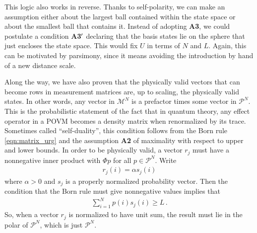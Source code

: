 \documentclass[%
 reprint,superscriptaddress,
 amsmath,amssymb,
 aps,pra, onecolumn, 12pt
]{revtex4-2}
\newcommand{\eqn}[1]{\begin{eqnarray} #1 \end{eqnarray}}
\newcommand{\zum}[2]{\displaystyle\sum_{#1}^{#2}}
\begin{document}
\begin{appendix}
This logic also works in reverse. Thanks to self-polarity, we can make an assumption either about the largest ball contained within the state space or about the smallest ball that contains it. Instead of adopting {\bf A3}, we could postulate a condition {\bf A3}${\bf '}$ declaring that the basis states lie on the sphere that just encloses the state space. This would fix $U$ in terms of $N$ and $L$. Again, this can be motivated by parsimony, since it means avoiding the introduction by hand of a new distance scale.

Along the way, we have also proven that the physically valid vectors that can become rows in measurement matrices are, up to scaling, the physically valid states. In other words, any vector in $\mathcal{M}^N$ is a prefactor times some vector in $\mathcal{P}^N$. This is the probabilistic statement of the fact that in quantum theory, any effect operator in a POVM becomes a density matrix when renormalized by its trace. Sometimes called ``self-duality'', this condition follows from the Born rule \eqref{eqn:matrix_urg} and the assumption {\bf A2} of maximality with respect to upper and lower bounds. In order to be physically valid, a vector $r_j$ must have a nonnegative inner product with $\Phi p$ for all $p \in \mathcal{P}^N$. Write
\eqn{
  r_j(i) = \alpha s_j(i)
}
where $\alpha > 0$ and $s_j$ is a properly normalized probability vector. Then the condition that the Born rule must give nonnegative values implies that
\eqn{
  \zum{i=1}{N} p(i) s_j(i) \geq L \, .
}
So, when a vector $r_j$ is normalized to have unit sum, the result must lie in the polar of $\mathcal{P}^N$, which is just $\mathcal{P}^N$.


\end{appendix}
\end{document}

